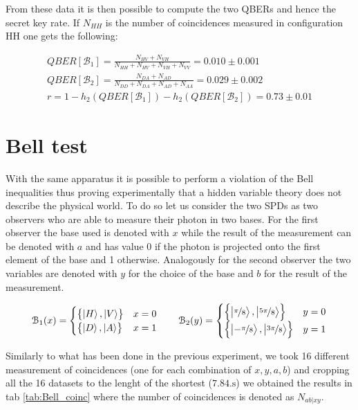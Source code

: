\documentclass[a4paper, 11pt]{article}
\begin{document}
      From these data it is then possible to compute the two QBERs and hence the secret key rate. If $N_{HH}$ is the number of coincidences measured in configuration HH one gets the following:

      \begin{gather*}
        QBER[\mathcal{B}_1] = \frac{N_{HV} + N_{VH}}{N_{HH} + N_{HV} + N_{VH} + N_{VV}} =  0.010 \pm 0.001 \\
        QBER[\mathcal{B}_2] = \frac{N_{DA} + N_{AD}}{N_{DD} + N_{DA} + N_{AD} + N_{AA}} = 0.029 \pm 0.002 \\
        r = 1 - h_2(QBER[\mathcal{B}_1]) - h_2(QBER[\mathcal{B}_2]) = 0.73 \pm 0.01
      \end{gather*}


  \section{Bell test}
    With the same apparatus it is possible to perform a violation of the Bell inequalities thus proving experimentally that a hidden variable theory does not describe the physical world. To do so let us consider the two SPDs as two observers who are able to measure their photon in two bases.
    For the first observer the base used is denoted with $x$ while the result of the measurement can be denoted with $a$ and has value 0 if the photon is projected onto the first element of the base and 1 otherwise. Analogously for the second observer the two variables are denoted with $y$ for the choice of the base and $b$ for the result of the measurement.

    \begin{gather*}
      \mathcal{B}_1(x) =
      \begin{cases}
        \left\{ \ket{H}, \ket{V} \right\} & x = 0 \\
        \left\{ \ket{D}, \ket{A} \right\} & x = 1
      \end{cases}
      \qquad
      \mathcal{B}_2(y) =
      \begin{cases}
        \left\{ \ket{\frac[f]{\pi}{8}}, \ket{\frac[f]{5\pi}{8}} \right\} & y = 0 \\
        \left\{ \ket{-\frac[f]{\pi}{8}}, \ket{\frac[f]{3\pi}{8}} \right\} & y = 1
      \end{cases}
    \end{gather*}

    Similarly to what has been done in the previous experiment, we took 16 different measurement of coincidences (one for each combination of $x,y,a,b$) and cropping all the 16 datasets to the lenght of the shortest ($7.84 \si{.\second}$) we obtained the results in tab \ref{tab:Bell_coinc} where the number of coincidences is denoted as $N_{ab|xy}$.
\end{document}
